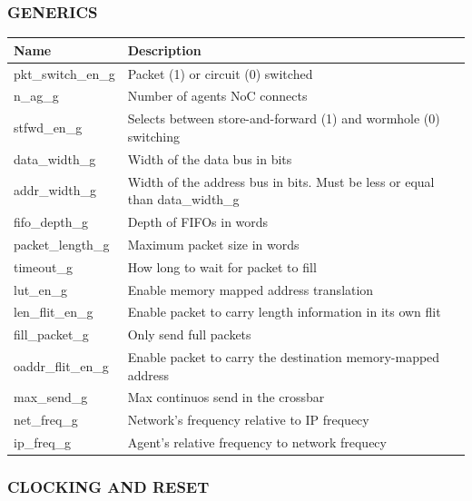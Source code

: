 \documentclass[a4paper,10pt,oneside,final]{article}
\def\deftablecolora{blue!10!white}
\def\deftablecolorb{white}
\begin{document}
\subsubsection{GENERICS}

\begin{center}
  \rowcolors{3}{\deftablecolora}{\deftablecolorb}

  \begin{tabularx}{\textwidth}{|lX|}
    \hline
    Name                & Description\\
    \hline
    pkt\_switch\_en\_g  & Packet (1) or circuit (0) switched\\
    n\_ag\_g            & Number of agents NoC connects\\
    stfwd\_en\_g     & Selects between store-and-forward (1) 
                          and wormhole (0) switching\\
    data\_width\_g  & Width of the data bus in bits\\
    addr\_width\_g  & Width of the address bus in bits. Must be less 
                          or equal than data\_width\_g\\
    fifo\_depth\_g   & Depth of FIFOs in words\\
    packet\_length\_g     & Maximum packet size in words\\
    timeout\_g          & How long to wait for packet to fill\\
    lut\_en\_g          & Enable memory mapped address translation\\
    len\_flit\_en\_g  & Enable packet to carry length information in 
                           its own flit\\
    fill\_packet\_g     & Only send full packets\\
    oaddr\_flit\_en\_g  & Enable packet to carry the destination 
                             memory-mapped address\\
    max\_send\_g       & Max continuos send in the crossbar\\
    net\_freq\_g  & Network's frequency relative to IP  frequecy\\
    ip\_freq\_g  & Agent's relative frequency to network frequecy\\
    \hline
  \end{tabularx}
\end{center}

\subsubsection{CLOCKING AND RESET}
\end{document}

